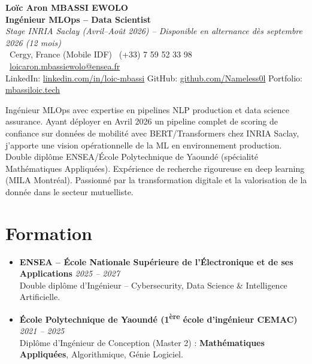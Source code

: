 \documentclass[a4paper,11pt]{article}
\begin{document}
\begin{center}
    {\Large \textbf{Lo\"ic Aron MBASSI EWOLO}} \\ \vspace{4pt}
    \textbf{\large Ing\'enieur MLOps -- Data Scientist} \\
    \textit{\small Stage INRIA Saclay (Avril--Ao\^ut 2026) -- Disponible en alternance d\`es septembre 2026 (12 mois)} \\ \vspace{4pt}
    \small
    \Pointinghand\ Cergy, France (Mobile IDF) \quad
    \Mobilefone\ (+33) 7 59 52 33 98 \quad
    {\color{primary}\Letter\ \href{mailto:loicaron.mbassiewolo@ensea.fr}{loicaron.mbassiewolo@ensea.fr}} \\ \vspace{2pt}
    {\color{primary}LinkedIn: \href{https://www.linkedin.com/in/loic-mbassi/}{linkedin.com/in/loic-mbassi}} \quad
    {\color{primary}GitHub: \href{https://github.com/Nameless0l}{github.com/Nameless0l}} \quad
    {\color{primary}Portfolio: \href{https://mbassiloic.tech}{mbassiloic.tech}}
\end{center}
\vspace{-6pt}
\noindent\small{Ing\'enieur MLOps avec expertise en pipelines NLP production et data science assurance. Ayant d\'eployer en Avril 2026 un pipeline complet de scoring de confiance sur donn\'ees de mobilit\'e avec BERT/Transformers chez INRIA Saclay, j'apporte une vision op\'erationnelle de la ML en environnement production. Double dipl\^ome ENSEA/\'Ecole Polytechnique de Yaound\'e (sp\'ecialit\'e Math\'ematiques Appliqu\'ees). Exp\'erience de recherche rigoureuse en deep learning (MILA Montr\'eal). Passionn\'e par la transformation digitale et la valorisation de la donn\'ee dans le secteur mutuelliste.}

\section{Formation}
\begin{itemize}[leftmargin=*, label=\tiny$\bullet$, nosep]
    \item \textbf{ENSEA -- \'Ecole Nationale Sup\'erieure de l'\'Electronique et de ses Applications} \hfill \textit{2025 -- 2027} \\
    \small{Double dipl\^ome d'Ing\'enieur -- Cybersecurity, Data Science \& Intelligence Artificielle.}
    \item \textbf{\'Ecole Polytechnique de Yaound\'e (1\textsuperscript{\`ere} \'ecole d'ing\'enieur CEMAC)} \hfill \textit{2021 -- 2025} \\
    \small{Dipl\^ome d'Ing\'enieur de Conception (Master 2) : \textbf{Math\'ematiques Appliqu\'ees}, Algorithmique, G\'enie Logiciel.}
\end{itemize}
\end{document}
